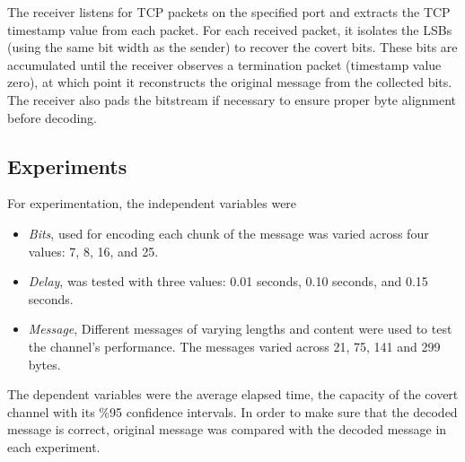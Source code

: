 \documentclass[10pt,a4paper]{article}
\begin{document}
The receiver listens for TCP packets on the specified port and extracts the TCP timestamp value from each packet.
 For each received packet, it isolates the LSBs (using the same bit width as the sender) to recover the covert bits. 
 These bits are accumulated until the receiver observes a termination packet (timestamp value zero), at which point it reconstructs the original message from the collected bits.
  The receiver also pads the bitstream if necessary to ensure proper byte alignment before decoding.


\subsection*{Experiments}
For experimentation, the independent variables were 
\begin{itemize}
    \item \textit{Bits}, used for encoding each chunk of the message was varied across four values: 7, 8, 16, and 25.
    \item \textit{Delay}, was tested with three values: 0.01 seconds, 0.10 seconds, and 0.15 seconds.
    \item \textit{Message}, Different messages of varying lengths and content were used to test the channel's performance. The messages varied across 21, 75, 141 and 299 bytes.

\end{itemize}

The dependent variables were the average elapsed time, the capacity of the covert channel with its \%95 confidence intervals.
In order to make sure that the decoded message is correct, original message was compared with the decoded message in each experiment. 
\end{document}
